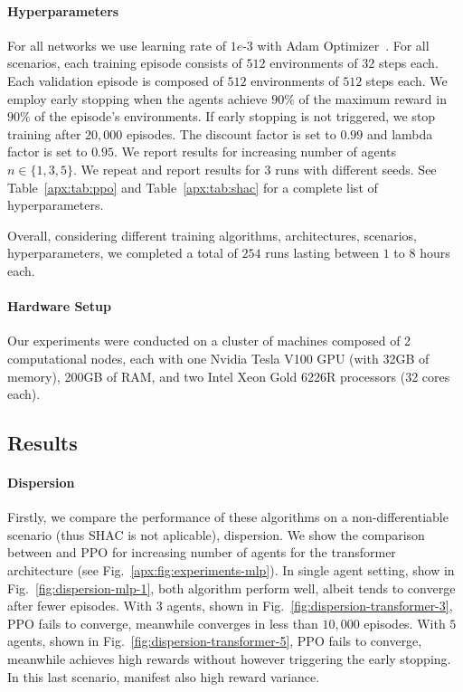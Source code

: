 \paragraph{Hyperparameters}
For all networks we use learning rate of $1e\text{-}3$ with Adam Optimizer~\cite{Kingma14}. For all scenarios, each training episode consists of $512$ environments of $32$ steps each. Each validation episode is composed of $512$ environments of $512$ steps each. We employ early stopping when the agents achieve $90\%$ of the maximum reward in $90\%$ of the episode's environments. If early stopping is not triggered, we stop training after $20,000$ episodes. The discount factor is set to $0.99$ and lambda factor is set to $0.95$. We report results for increasing number of agents $n\in\{1,3,5\}$. We repeat and report results for $3$ runs with different seeds. See Table~\ref{apx:tab:ppo} and Table~\ref{apx:tab:shac} for a complete list of hyperparameters.

Overall, considering different training algorithms, architectures, scenarios, hyperparameters, we completed a total of $254$ runs lasting between $1$ to $8$ hours each. 

\paragraph{Hardware Setup}
Our experiments were conducted on a cluster of machines composed of 2 computational nodes, each with one Nvidia Tesla V100 GPU (with 32GB of memory), 200GB of RAM, and two Intel Xeon Gold 6226R processors (32 cores each).

\subsection{Results}

\paragraph{Dispersion}
Firstly, we compare the performance of these algorithms on a non-differentiable scenario (thus SHAC is not aplicable), dispersion. We show the comparison between \fname{} and PPO for increasing number of agents for the transformer architecture (see Fig.~\ref{apx:fig:experiments-mlp}). In single agent setting, show in Fig.~\ref{fig:dispersion-mlp-1}, both algorithm perform well, albeit \fname{} tends to converge after fewer episodes. With $3$ agents, shown in Fig.~\ref{fig:dispersion-transformer-3}, PPO fails to converge, meanwhile \fname{} converges in less than $10,000$ episodes. With $5$ agents, shown in Fig.~\ref{fig:dispersion-transformer-5}, PPO fails to converge, meanwhile \fname{} achieves high rewards without however triggering the early stopping. In this last scenario, \fname{} manifest also high reward variance.

